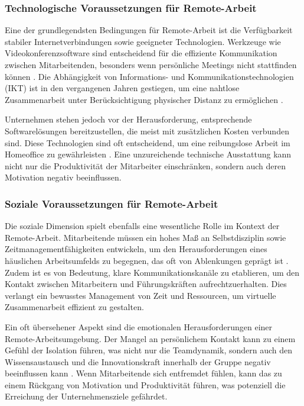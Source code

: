 \subsubsection{Technologische Voraussetzungen für Remote-Arbeit}  
Eine der grundlegendsten Bedingungen für Remote-Arbeit ist die Verfügbarkeit stabiler Internetverbindungen sowie geeigneter Technologien. Werkzeuge wie Videokonferenzsoftware sind entscheidend für die effiziente Kommunikation zwischen Mitarbeitenden, besonders wenn persönliche Meetings nicht stattfinden können \cite{file2}. Die Abhängigkeit von Informations- und Kommunikationstechnologien (IKT) ist in den vergangenen Jahren gestiegen, um eine nahtlose Zusammenarbeit unter Berücksichtigung physischer Distanz zu ermöglichen \cite{file2}. 

Unternehmen stehen jedoch vor der Herausforderung, entsprechende Softwarelösungen bereitzustellen, die meist mit zusätzlichen Kosten verbunden sind. Diese Technologien sind oft entscheidend, um eine reibungslose Arbeit im Homeoffice zu gewährleisten \cite{file4}. Eine unzureichende technische Ausstattung kann nicht nur die Produktivität der Mitarbeiter einschränken, sondern auch deren Motivation negativ beeinflussen.

\subsubsection{Soziale Voraussetzungen für Remote-Arbeit}  
Die soziale Dimension spielt ebenfalls eine wesentliche Rolle im Kontext der Remote-Arbeit. Mitarbeitende müssen ein hohes Maß an Selbstdisziplin sowie Zeitmanagementfähigkeiten entwickeln, um den Herausforderungen eines häuslichen Arbeitsumfelds zu begegnen, das oft von Ablenkungen geprägt ist \cite{file2}. Zudem ist es von Bedeutung, klare Kommunikationskanäle zu etablieren, um den Kontakt zwischen Mitarbeitern und Führungskräften aufrechtzuerhalten. Dies verlangt ein bewusstes Management von Zeit und Ressourcen, um virtuelle Zusammenarbeit effizient zu gestalten.

Ein oft übersehener Aspekt sind die emotionalen Herausforderungen einer Remote-Arbeitsumgebung. Der Mangel an persönlichem Kontakt kann zu einem Gefühl der Isolation führen, was nicht nur die Teamdynamik, sondern auch den Wissensaustausch und die Innovationskraft innerhalb der Gruppe negativ beeinflussen kann \cite{file2}. Wenn Mitarbeitende sich entfremdet fühlen, kann das zu einem Rückgang von Motivation und Produktivität führen, was potenziell die Erreichung der Unternehmensziele gefährdet.

